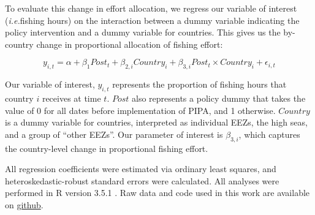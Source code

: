 \documentclass[12pt,]{article}
\begin{document}
To evaluate this change in effort allocation, we regress our variable of
interest (\emph{i.e.}fishing hours) on the interaction between a dummy
variable indicating the policy intervention and a dummy variable for
countries. This gives us the by-country change in proportional
allocation of fishing effort:

\[
y_{i,t} = \alpha + \beta_1Post_t + \beta_{2,i}Country_i + \beta_{3,i}Post_t \times Country_i + \epsilon_{i,t}
\]

Our variable of interest, \(y_{i,t}\) represents the proportion of
fishing hours that country \(i\) receives at time \(t\). \(Post\) also
represents a policy dummy that takes the value of 0 for all dates before
implementation of PIPA, and 1 otherwise. \(Country\) is a dummy variable
for countries, interpreted as individual EEZs, the high seas, and a
group of ``other EEZs''. Our parameter of interest is \(\beta_{3,i}\),
which captures the country-level change in proportional fishing effort.

All regression coefficients were estimated via ordinary least squares,
and heteroskedastic-robust standard errors were calculated. All analyses
were performed in R version 3.5.1 \citep{rcore_2018}. Raw data and code
used in this work are available on
\href{https://github.com/jcvdav/MPA_displacement}{github}.
\end{document}
